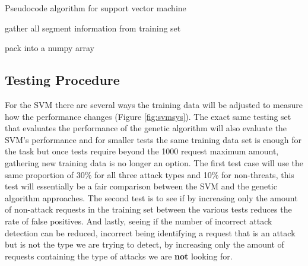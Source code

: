 \begin{algorithm}[H]
	\caption{Pseudocode algorithm for support vector machine}
	\label{alg:svm}

	gather all segment information from training set\;

	pack into a numpy array\;

\end{algorithm}

\subsection{Testing Procedure}

For the SVM there are several ways the training data will be adjusted to measure how the performance changes (Figure \ref{fig:svmsys}).  The exact same testing set that evaluates the performance of the genetic algorithm will also evaluate the SVM’s performance and for smaller tests the same training data set is enough for the task but once tests require beyond the 1000 request maximum amount, gathering new training data is no longer an option.  The first test case will use the same proportion of 30\% for all three attack types and 10\% for non-threats, this test will essentially be a fair comparison between the SVM and the genetic algorithm approaches.  The second test is to see if by increasing only the amount of non-attack requests in the training set between the various tests reduces the rate of false positives.  And lastly, seeing if the number of incorrect attack detection can be reduced, incorrect being identifying a request that is an attack but is not the type we are trying to detect, by increasing only the amount of requests containing the type of attacks we are \textbf{not} looking for.
